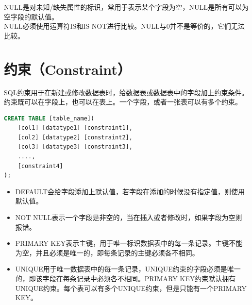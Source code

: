 \documentclass[12pt, openany, oneside]{book}
\begin{document}
NULL是对未知/缺失属性的标识，常用于表示某个字段为空，NULL是所有可以为空字段的默认值。\\

NULL必须使用运算符IS和IS NOT进行比较。NULL与0并不是等价的，它们无法比较。\\

\section{约束（Constraint）}

SQL约束用于在新建或修改数据表时，给数据表或数据表中的字段加上约束条件。约束既可以在字段上，也可以在表上。一个字段，或者一张表可以有多个约束。

\vspace{-0.5cm}

\begin{lstlisting}[language=SQL]
CREATE TABLE [table_name](
    [col1] [datatype1] [constraint1],
    [col2] [datatype2] [constraint2],
    [col3] [datatype3] [constraint3],
    ....,
    [constraint4]
);
\end{lstlisting}

\begin{table}[H]
	\centering
	\caption{约束}
\end{table}

\begin{itemize}
	\item DEFAULT会给字段添加上默认值，若字段在添加的时候没有指定值，则使用默认值。

	\item NOT NULL表示一个字段是非空的，当在插入或者修改时，如果字段为空则报错。

	\item PRIMARY KEY表示主键，用于唯一标识数据表中的每一条记录。主键不能为空，并且必须是唯一的，即每条记录的主键必须各不相同。

	\item UNIQUE用于唯一数据表中的每一条记录，UNIQUE约束的字段必须是唯一的，即该字段在每条记录中必须各不相同。PRIMARY KEY约束默认拥有UNIQUE约束。每个表可以有多个UNIQUE约束，但是只能有一个PRIMARY KEY。
\end{itemize}
\end{document}
